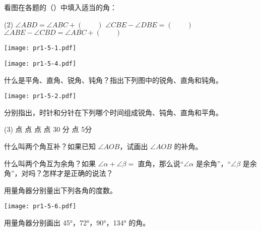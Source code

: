 \begin{Practice}
\begin{question}
	\item\label{prac:1-5-1} 看图在各题的（\qquad）中填入适当的角：
	\begin{tasks}(2)
		\task $\angle ABD=\angle ABC+(\qquad )$
		\task $\angle CBE-\angle DBE=(\qquad)$
		\task* $\angle ABE-\angle CBD=\angle ABC+(\qquad)$
	\end{tasks}
	\begin{figurehere}
		\begin{minipage}[b]{0.48\linewidth}
			\centering
			\texttt{[image: pr1-5-1.pdf]}
			\caption*{第 \ref{prac:1-5-1} 题}
		\end{minipage}
		\begin{minipage}[b]{0.48\linewidth}
			\centering
			\texttt{[image: pr1-5-4.pdf]}
			\caption*{第 \ref{prac:1-5-4} 题}
		\end{minipage}
	\end{figurehere}
	\item\label{prac:1-5-2} 什么是平角、直角、锐角、钝角？指出下列图中的锐角、直角和钝角。
	\begin{figurehere}
		\begin{minipage}{\linewidth}\centering
			\texttt{[image: pr1-5-2.pdf]}
			\caption*{第 \ref{prac:1-5-2} 题}
		\end{minipage}
	\end{figurehere}
	\item 分别指出，时针和分针在下列哪个时间组成锐角、钝角、直角和平角。
	\begin{tasks}(3)
		\task 4 点
		\task 6 点
		\task 9 点
		 点 30 分
		 点 5分
	\end{tasks}
	\item\label{prac:1-5-4} 什么叫两个角互补？如果已知 $\angle AOB$，试画出 $\angle AOB$ 的补角。
	\item 什么叫两个角互为余角？如果 $\angle \alpha+\angle \beta=$ 直角，那么说“$\angle \alpha$ 是余角”，“$\angle\beta$ 是余角”，对吗？怎样才是正确的说法？
	\item\label{prac:1-5-6} 用量角器分别量出下列各角的度数。
	\begin{figurehere}
		\begin{minipage}{\linewidth}\centering
			\texttt{[image: pr1-5-6.pdf]}
			\caption*{第 \ref{prac:1-5-6} 题}
		\end{minipage}
	\end{figurehere}
	\item 用量角器分别画出 \ang{45}，\ang{72}，\ang{90}，\ang{134} 的角。

\end{question}
\end{Practice}
